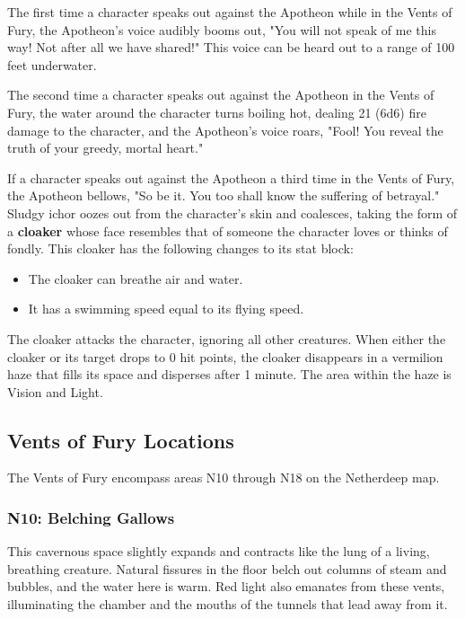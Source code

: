 \documentclass[10pt,a4paper,twoside,bg=print,twocolumn,openany,nodeprecatedcode]{dndbook}
\begin{document}
The first time a character speaks out against the Apotheon while in the Vents of Fury, the Apotheon's voice audibly booms out, "You will not speak of me this way! Not after all we have shared!" This voice can be heard out to a range of 100 feet underwater.

The second time a character speaks out against the Apotheon in the Vents of Fury, the water around the character turns boiling hot, dealing 21 (6d6) fire damage to the character, and the Apotheon's voice roars, "Fool! You reveal the truth of your greedy, mortal heart."

If a character speaks out against the Apotheon a third time in the Vents of Fury, the Apotheon bellows, "So be it. You too shall know the suffering of betrayal." Sludgy ichor oozes out from the character's skin and coalesces, taking the form of a \textbf{cloaker} whose face resembles that of someone the character loves or thinks of fondly. This cloaker has the following changes to its stat block:


\begin{itemize}
\item The cloaker can breathe air and water.
\item It has a swimming speed equal to its flying speed.
\end{itemize}

The cloaker attacks the character, ignoring all other creatures. When either the cloaker or its target drops to 0 hit points, the cloaker disappears in a vermilion haze that fills its space and disperses after 1 minute. The area within the haze is Vision and Light.

\subsection{Vents of Fury Locations}
The Vents of Fury encompass areas N10 through N18 on the Netherdeep map.

\subsubsection{N10: Belching Gallows}
\begin{DndReadAloud}{}
This cavernous space slightly expands and contracts like the lung of a living, breathing creature. Natural fissures in the floor belch out columns of steam and bubbles, and the water here is warm. Red light also emanates from these vents, illuminating the chamber and the mouths of the tunnels that lead away from it.

\end{DndReadAloud}
\end{document}
